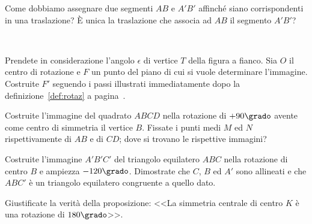 \begin{esercizio}
\label{ese:8.47} %
Come dobbiamo assegnare due segmenti \(AB\) e \(A'B'\) affinché siano 
corrispondenti in una traslazione? \`E unica la traslazione che 
associa ad \(AB\) il segmento \(A'B'\)?
\end{esercizio}

\begin{esercizio}
\label{ese:}
~

\noindent\begin{minipage}{.70\textwidth}
Prendete in considerazione l'angolo \(\epsilon\) di vertice \(T\) della 
figura a fianco. Sia \(O\) il centro di rotazione e \(F\) un punto del 
piano di cui si vuole determinare l'immagine. Costruite \(F'\) seguendo 
i passi illustrati immediatamente dopo la definizione~\ref{def:rotaz} 
a pagina~\pageref{def:rotaz}.
\end{minipage} 
\begin{minipage}{.28\textwidth}
\begin{inaccessibleblock}
\begin{center}  \end{center}
\end{inaccessibleblock}
\end{minipage}
\end{esercizio}

\begin{esercizio}
\label{ese:8.59} %
Costruite l'immagine del quadrato \(ABCD\) nella rotazione di 
\(+90\grado\) avente come centro di simmetria il vertice \(B\).
Fissate i punti medi \(M\) ed \(N\) rispettivamente di \(AB\) e di \(CD\); 
dove si trovano le rispettive immagini?
\end{esercizio}

\begin{esercizio}
\label{ese:8.62} %
Costruite l'immagine \(A'B'C'\) del triangolo equilatero \(ABC\) nella 
rotazione di centro \(B\) e ampiezza \(-120\grado\). Dimostrate che \(C\), 
\(B\) ed \(A'\) sono allineati e che \(ABC'\) è un triangolo equilatero 
congruente a quello dato.
\end{esercizio}

\begin{esercizio}
\label{ese:8.68} %
Giustificate la verità della proposizione: <<La simmetria centrale di 
centro \(K\) è una rotazione di \(180\grado\)>>.
\end{esercizio}

